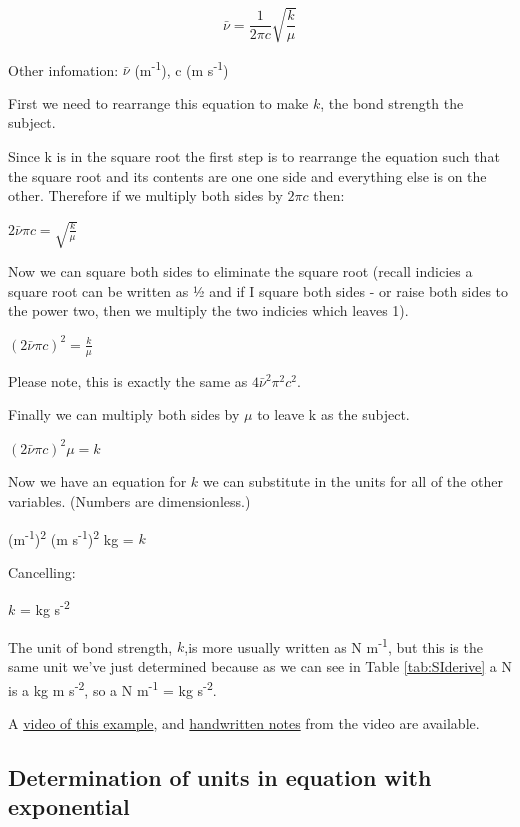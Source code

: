 \documentclass[
]{book}
\begin{document}
\begin{equation}
\bar{\nu}=\frac{1}{2 \pi c}\sqrt{\frac{k}{\mu}}
\label{eq:bondvib}
\end{equation}

Other infomation: \(\bar{\nu}\) (m\textsuperscript{-1}), c (m s\textsuperscript{-1})

First we need to rearrange this equation to make \(k\), the bond strength the subject.

Since k is in the square root the first step is to rearrange the equation such that the square root and its contents are one one side and everything else is on the other. Therefore if we multiply both sides by \(2 \pi c\) then:

\(2 \bar{\nu} \pi c = \sqrt{\frac{k}{\mu}}\)

Now we can square both sides to eliminate the square root (recall indicies a square root can be written as ½ and if I square both sides - or raise both sides to the power two, then we multiply the two indicies which leaves 1).

\((2 \bar{\nu} \pi c)^2 = \frac{k}{\mu}\)

Please note, this is exactly the same as \(4 \bar{\nu}^2 \pi^2 c^2\).

Finally we can multiply both sides by \(\mu\) to leave k as the subject.

\((2 \bar{\nu} \pi c)^2 \mu = k\)

Now we have an equation for \(k\) we can substitute in the units for all of the other variables. (Numbers are dimensionless.)

(m\textsuperscript{-1})\textsuperscript{2} (m s\textsuperscript{-1})\textsuperscript{2} kg = \(k\)

Cancelling:

\(k\) = kg s\textsuperscript{-2}

The unit of bond strength, \(k\),is more usually written as N m\textsuperscript{-1}, but this is the same unit we've just determined because as we can see in Table \ref{tab:SIderive} a N is a kg m s\textsuperscript{-2}, so a N m\textsuperscript{-1} = kg s\textsuperscript{-2}.

A \href{https://youtu.be/Q5H00hU6-Wk}{video of this example}, and \href{http://workitoutwithapencil.xyz/wp-content/uploads/2021/07/Determining-units-of-k.pdf}{handwritten notes} from the video are available.

\hypertarget{determination-of-units-in-equation-with-exponential}{%
\subsection{Determination of units in equation with exponential}\label{determination-of-units-in-equation-with-exponential}}
\end{document}
